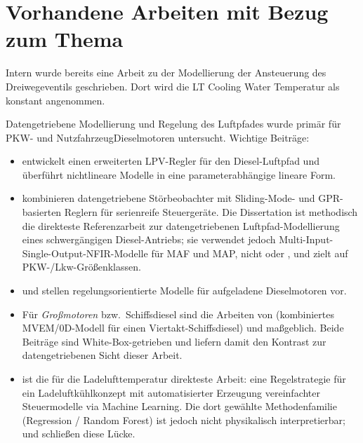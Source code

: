 \section{Vorhandene Arbeiten mit Bezug zum Thema}
\label{sec.sot.application}
Intern wurde bereits eine Arbeit zu der Modellierung der Ansteuerung des Dreiwegeventils geschrieben. Dort wird die LT Cooling Water Temperatur als konstant angenommen. \cite{rupprechtAnalysisSimulationOptimisation2016}



Datengetriebene Modellierung und Regelung des Luftpfades wurde primär für
PKW- und Nutzfahrzeug\-Dieselmotoren untersucht. Wichtige Beiträge:

\begin{itemize}
  \item \cite{atamAdvancedAirPath2018} entwickelt einen erweiterten
    LPV-Regler für den Diesel-Luftpfad und überführt nichtlineare
    Modelle in eine parameterabhängige lineare Form.
  \item \cite{aranDieselEngineAirpath2020, aranFlexibleRobustControl2019}
    kombinieren datengetriebene Störbeobachter mit Sliding-Mode- und
    GPR-basierten Reglern für serienreife Steuergeräte. Die Dissertation
    \cite{aranFlexibleRobustControl2019} ist methodisch die direkteste
    Referenzarbeit zur datengetriebenen Luftpfad-Modellierung eines
    schwergängigen Diesel-Antriebs; sie verwendet jedoch
    Multi-Input-Single-Output-NFIR-Modelle für MAF und MAP, nicht
    \sindy{} oder \edmd, und zielt auf PKW-/Lkw-Größenklassen.
  \item \cite{bardosControlOrientedAir2013} und
    \cite{moriyasuDieselEngineAir2019} stellen regelungsorientierte
    Modelle für aufgeladene Dieselmotoren vor.
  \item Für \emph{Großmotoren} bzw.\ Schiffsdiesel sind die Arbeiten von
    \cite{baldiDevelopmentCombinedMean2015} (kombiniertes MVEM/0D-Modell
    für einen Viertakt-Schiffsdiesel) und
    \cite{theotokatosCycleMeanValue2010} maßgeblich. Beide Beiträge sind
    White-Box-getrieben und liefern damit den Kontrast zur
    datengetriebenen Sicht dieser Arbeit.
  \item \cite{beranModelbasedApproachControl2021} ist die für die
    Ladelufttemperatur direkteste Arbeit: eine Regelstrategie für ein
    Ladeluftkühlkonzept mit automatisierter Erzeugung vereinfachter
    Steuermodelle via Machine Learning. Die dort gewählte
    Methodenfamilie (Regression / Random Forest) ist jedoch nicht
    physikalisch interpretierbar; \sindy{} und \edmd{} schließen diese
    Lücke.
\end{itemize}

